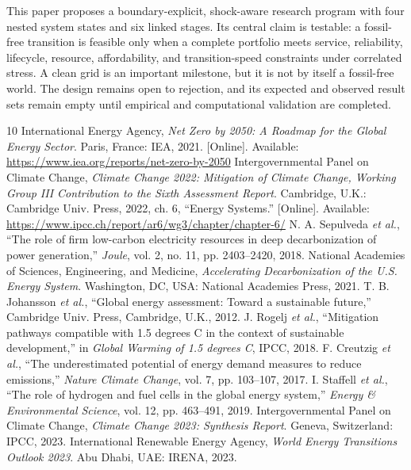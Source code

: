 \documentclass[conference]{IEEEtran}
\begin{document}
This paper proposes a boundary-explicit, shock-aware research program with four nested system states and six linked stages. Its central claim is testable: a fossil-free transition is feasible only when a complete portfolio meets service, reliability, lifecycle, resource, affordability, and transition-speed constraints under correlated stress. A clean grid is an important milestone, but it is not by itself a fossil-free world. The design remains open to rejection, and its expected and observed result sets remain empty until empirical and computational validation are completed.

\begin{thebibliography}{10}
 International Energy Agency, \emph{Net Zero by 2050: A Roadmap for the Global Energy Sector}. Paris, France: IEA, 2021. [Online]. Available: \url{https://www.iea.org/reports/net-zero-by-2050}
 Intergovernmental Panel on Climate Change, \emph{Climate Change 2022: Mitigation of Climate Change, Working Group III Contribution to the Sixth Assessment Report}. Cambridge, U.K.: Cambridge Univ. Press, 2022, ch. 6, ``Energy Systems.'' [Online]. Available: \url{https://www.ipcc.ch/report/ar6/wg3/chapter/chapter-6/}
 N. A. Sepulveda \emph{et al.}, ``The role of firm low-carbon electricity resources in deep decarbonization of power generation,'' \emph{Joule}, vol. 2, no. 11, pp. 2403--2420, 2018.
 National Academies of Sciences, Engineering, and Medicine, \emph{Accelerating Decarbonization of the U.S. Energy System}. Washington, DC, USA: National Academies Press, 2021.
 T. B. Johansson \emph{et al.}, ``Global energy assessment: Toward a sustainable future,'' Cambridge Univ. Press, Cambridge, U.K., 2012.
 J. Rogelj \emph{et al.}, ``Mitigation pathways compatible with 1.5 degrees C in the context of sustainable development,'' in \emph{Global Warming of 1.5 degrees C}, IPCC, 2018.
 F. Creutzig \emph{et al.}, ``The underestimated potential of energy demand measures to reduce emissions,'' \emph{Nature Climate Change}, vol. 7, pp. 103--107, 2017.
 I. Staffell \emph{et al.}, ``The role of hydrogen and fuel cells in the global energy system,'' \emph{Energy \& Environmental Science}, vol. 12, pp. 463--491, 2019.
 Intergovernmental Panel on Climate Change, \emph{Climate Change 2023: Synthesis Report}. Geneva, Switzerland: IPCC, 2023.
 International Renewable Energy Agency, \emph{World Energy Transitions Outlook 2023}. Abu Dhabi, UAE: IRENA, 2023.
\end{thebibliography}
\end{document}
